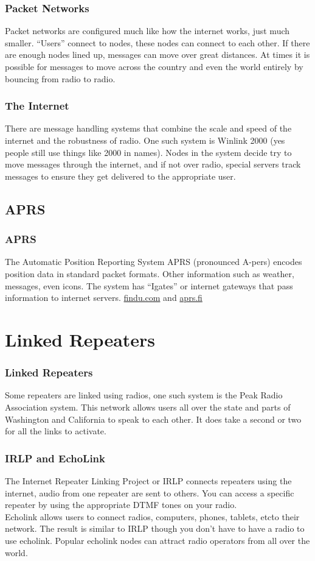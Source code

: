 \documentclass[10pt, handout]{beamer}
\begin{document}
\begin{frame}
\frametitle{Packet Networks}
Packet networks are configured much like how the internet works, just much smaller. ``Users'' connect to nodes, these nodes can connect to each other. If there are enough nodes lined up, messages can move over great distances. At times it is possible for messages to move across the country and even the world entirely by bouncing from radio to radio.
\end{frame}

\begin{frame}
\frametitle{The Internet}
There are message handling systems that combine the scale and speed of the internet and the robustness of radio. One such system is Winlink 2000 (yes people still use things like 2000 in names). Nodes in the system decide try to move messages through the internet, and if not over radio, special servers track messages to ensure they get delivered to the appropriate user.
\end{frame}

\subsection{APRS}

\begin{frame}
\frametitle{APRS}
The Automatic Position Reporting System APRS (pronounced A-pers) encodes position data in standard packet formats. Other information such as weather, messages, even icons. The system has ``Igates'' or internet gateways that pass information to internet servers. \hyperlink{www.findu.com}{findu.com} and \hyperlink{www.aprs.fi}{aprs.fi}
\end{frame}

\section{Linked Repeaters}

\begin{frame}
\frametitle{Linked Repeaters}
Some repeaters are linked using radios, one such system is the Peak Radio Association system. This network allows users all over the state and parts of Washington and California to speak to each other. It does take a second or two for all the links to activate.
\end{frame}

\begin{frame}
\frametitle{IRLP and EchoLink}
The Internet Repeater Linking Project or IRLP connects repeaters using the internet, audio from one repeater are sent to others. You can access a specific repeater by using the appropriate DTMF tones on your radio.\\
Echolink allows users to connect radios, computers, phones, tablets, etc\. to their network. The result is similar to IRLP though you don't have to have a radio to use echolink. Popular echolink nodes can attract radio operators from all over the world.
\end{frame}
\end{document}
